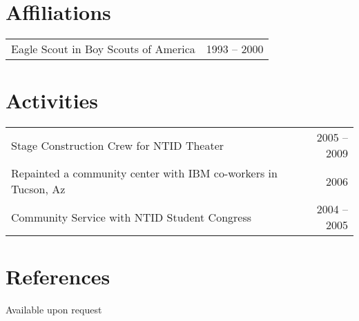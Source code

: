 \documentclass[letterpaper, paper=letter, pagesize, oneside, final]{scrartcl}
\begin{document}
\begin{center}
\section{Affiliations}

\begin{tabularx}{0.97\linewidth}{Xr}
Eagle Scout in Boy Scouts of America & 1993 -- 2000 \\
\end{tabularx}

\section{Activities}

\begin{tabularx}{0.97\linewidth}{Xr}
Stage Construction Crew for NTID Theater & 2005 -- 2009 \\
Repainted a community center with IBM co-workers in Tucson, Az & 2006 \\
Community Service with NTID Student Congress & 2004 -- 2005 \\
\end{tabularx}

\section{References}

\parbox{0.945\linewidth}{Available upon request}

\end{center}
\end{document}
